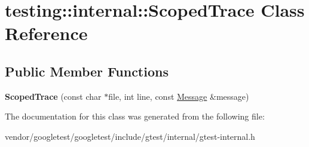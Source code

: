 \hypertarget{classtesting_1_1internal_1_1ScopedTrace}{}\section{testing\+:\+:internal\+:\+:Scoped\+Trace Class Reference}
\label{classtesting_1_1internal_1_1ScopedTrace}
\subsection*{Public Member Functions}
\begin{DoxyCompactItemize}
\item 
{\bfseries Scoped\+Trace} (const char $\ast$file, int line, const \hyperlink{classtesting_1_1Message}{Message} \&message)\hypertarget{classtesting_1_1internal_1_1ScopedTrace_ab965d7010bbbc82c1bef6ebf8748bede}{}\label{classtesting_1_1internal_1_1ScopedTrace_ab965d7010bbbc82c1bef6ebf8748bede}

\end{DoxyCompactItemize}


The documentation for this class was generated from the following file\+:\begin{DoxyCompactItemize}
\item 
vendor/googletest/googletest/include/gtest/internal/gtest-\/internal.\+h\end{DoxyCompactItemize}

